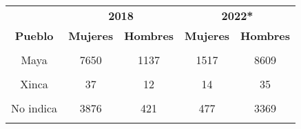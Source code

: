 \begin{tabular}[t]{ccccc}
\toprule
\multicolumn{1}{c}{\textbf{ }} & \multicolumn{2}{c}{\textbf{2018}} & \multicolumn{2}{c}{\textbf{2022*}} \\
\cmidrule(l{3pt}r{3pt}){2-3} \cmidrule(l{3pt}r{3pt}){4-5}
\textbf{Pueblo} & \textbf{Mujeres} & \textbf{Hombres} & \textbf{Mujeres} & \textbf{Hombres}\\
\midrule
\cellcolor[HTML]{B6B3FF}{Ladinos(as)} & \cellcolor[HTML]{B6B3FF}{14320} & \cellcolor[HTML]{B6B3FF}{2118} & \cellcolor[HTML]{B6B3FF}{3315} & \cellcolor[HTML]{B6B3FF}{19133}\\
Maya & 7650 & 1137 & 1517 & 8609\\
\cellcolor[HTML]{B6B3FF}{Garifuna} & \cellcolor[HTML]{B6B3FF}{46} & \cellcolor[HTML]{B6B3FF}{11} & \cellcolor[HTML]{B6B3FF}{6} & \cellcolor[HTML]{B6B3FF}{40}\\
Xinca & 37 & 12 & 14 & 35\\
\cellcolor[HTML]{B6B3FF}{Otro} & \cellcolor[HTML]{B6B3FF}{91} & \cellcolor[HTML]{B6B3FF}{10} & \cellcolor[HTML]{B6B3FF}{25} & \cellcolor[HTML]{B6B3FF}{152}\\
No indica & 3876 & 421 & 477 & 3369\\
\cellcolor[HTML]{B6B3FF}{Ignorado} & \cellcolor[HTML]{B6B3FF}{234} & \cellcolor[HTML]{B6B3FF}{29} & \cellcolor[HTML]{B6B3FF}{102} & \cellcolor[HTML]{B6B3FF}{400}\\
\bottomrule
\end{tabular}
